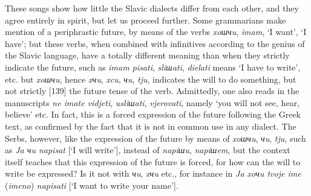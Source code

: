 These songs show how little the Slavic dialects differ from each other, and they agree entirely in spirit, but let us proceed further. Some grammarians make mention of a periphrastic future, by means of the verbs \textit{xoшчu}, \textit{imam}, ‘I want’, ‘I have’; but these verbs, when combined with infinitives according to the genius of the Slavic language, have a totally different meaning than when they strictly indicate the future, such as \textit{imam pisati}, \textit{sliшati}, \textit{dielati} means ‘I have to write’, etc. but \textit{xoшчu}, hence \textit{xчu}, \textit{xcu}, \textit{чu}, \textit{tju}, indicates the will to do something, but not strictly [139] the future tense of the verb. Admittedly, one also reads in the manuscripts \textit{ne imate vidjeti}, \textit{usliшati}, \textit{vjerovati}, namely ‘you will not see, hear, believe’ etc. In fact, this is a forced expression of the future following the Greek text, as confirmed by the fact that it is not in common use in any dialect. The Serbs, however, like the expression of the future by means of \textit{xoшчu}, \textit{чu}, \textit{tju}, such as \textit{Ja чu napisat} [‘I will write’], instead of \textit{napiшu}, \textit{napiшem}, but the context itself teaches that this expression of the future is forced, for how can the will to write be expressed? Is it not with \textit{чu}, \textit{xчu} etc., for instance in \textit{Ja xoчu tvoje ime} (\textit{imeno}) \textit{napisati} [‘I want to write your name’].

